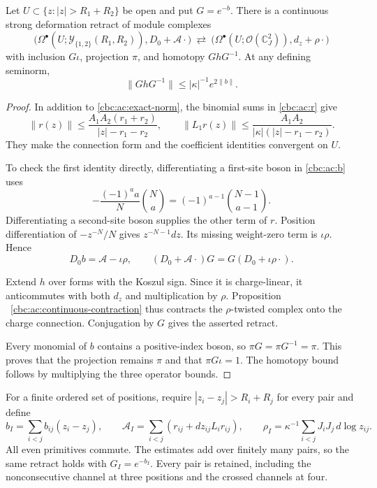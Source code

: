 \begin{theorem}
\label{cbc:ac:gauge-retract}
Let $U\subset\{z:|z|>R_1+R_2\}$ be open and put
$G=e^{-b}$. There is a continuous strong deformation
retract of module complexes
\[
 \bigl(\Omega^\bullet(U;\mathcal Y_{\{1,2\}}(R_1,R_2)),
                                      D_0+\mathcal A\cdot\bigr)
 \ \rightleftarrows\
 \bigl(\Omega^\bullet(U;\mathcal O(\mathbb C^2_J)),
                                      d_z+\rho\cdot\bigr)
\]
with inclusion $G\iota$, projection $\pi$, and homotopy
$GhG^{-1}$. At any defining seminorm,
\[
 \|GhG^{-1}\|\leq|\kappa|^{-1}e^{2\|b\|}.
\]
\end{theorem}
\begin{proof}
In addition to \eqref{cbc:ac:exact-norm}, the binomial
sums in \eqref{cbc:ac:r} give
\[
 \|r(z)\|\leq
      \frac{A_1A_2(r_1+r_2)}{|z|-r_1-r_2},
 \qquad
 \|L_1r(z)\|\leq
      \frac{A_1A_2}{|\kappa|(|z|-r_1-r_2)}.
\]
They make the connection form and the coefficient
identities convergent on $U$.

To check the first identity
directly, differentiating a first-site boson in
\eqref{cbc:ac:b} uses
\[
 -\frac{(-1)^a a}{N}\binom Na
                 =(-1)^{a-1}\binom{N-1}{a-1}.
\]
Differentiating a second-site boson supplies the other
term of $r$. Position differentiation of $-z^{-N}/N$
gives $z^{-N-1}dz$. Its missing weight-zero term is
$\iota\rho$. Hence
\[
 D_0b=\mathcal A-\iota\rho,\qquad
 (D_0+\mathcal A\cdot)G=G(D_0+\iota\rho\cdot).
\]

Extend $h$ over forms with the Koszul sign. Since it is
charge-linear, it anticommutes with both $d_z$ and
multiplication by $\rho$. Proposition
~\ref{cbc:ac:continuous-contraction} thus contracts the
$\rho$-twisted complex onto the charge connection.
Conjugation by $G$ gives the asserted retract.

Every monomial of $b$ contains a positive-index boson,
so $\pi G=\pi G^{-1}=\pi$. This proves that the
projection remains $\pi$ and that $\pi G\iota=1$.
The homotopy bound follows by multiplying the three
operator bounds.
\end{proof}

For a finite ordered set of positions, require
$|z_i-z_j|>R_i+R_j$ for every pair and define
\[
 b_I=\sum_{i<j}b_{ij}(z_i-z_j),\qquad
 \mathcal A_I=\sum_{i<j}(r_{ij}+dz_{ij}L_i r_{ij}),
 \qquad
 \rho_I=\kappa^{-1}\sum_{i<j}J_iJ_j\,d\log z_{ij}.
\]
All even primitives commute. The estimates add over
finitely many pairs, so the same retract holds with
$G_I=e^{-b_I}$. Every pair is retained, including the
nonconsecutive channel at three positions and the
crossed channels at four.

